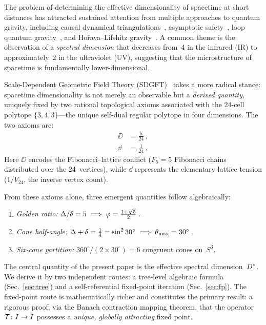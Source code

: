 \documentclass[amsmath,amssymb,aps,prd,twocolumn,superscriptaddress,nofootinbib]{revtex4-2}
\begin{document}
The problem of determining the effective dimensionality of spacetime
at short distances has attracted sustained attention from multiple
approaches to quantum gravity, including causal dynamical
triangulations~\cite{Ambjorn2005}, asymptotic
safety~\cite{Lauscher2005,Reuter2012}, loop quantum
gravity~\cite{Modesto2009}, and Ho\v{r}ava--Lifshitz
gravity~\cite{Horava2009}.  A common theme is the observation of a
\emph{spectral dimension} that decreases from~4 in the infrared (IR)
to approximately~2 in the ultraviolet (UV), suggesting that the
microstructure of spacetime is fundamentally lower-dimensional.

Scale-Dependent Geometric Field Theory
(SDGFT)~\cite{Goldstein_Paper01,Goldstein_Paper02,Goldstein_Paper03}
takes a more radical stance: spacetime dimensionality is not merely
an observable but a \emph{derived quantity}, uniquely fixed by two
rational topological axioms associated with the 24-cell polytope
$\{3,4,3\}$---the unique self-dual regular polytope in four
dimensions.  The two axioms are:
\begin{align}
  \DD &= \frac{5}{24}\,, \label{eq:axiom_Delta} \\
  \dd &= \frac{1}{24}\,. \label{eq:axiom_delta}
\end{align}
Here $\DD$ encodes the Fibonacci--lattice conflict
($F_5 = 5$ Fibonacci chains distributed over the 24~vertices),
while $\dd$ represents the elementary lattice tension
($1/V_{24}$, the inverse vertex count).

From these axioms alone, three emergent quantities follow
algebraically:
\begin{enumerate}
  \item \emph{Golden ratio:}\quad
    $\Delta/\delta = 5 \;\Longrightarrow\;
     \varphi = \tfrac{1+\sqrt{5}}{2}$\,.
  \item \emph{Cone half-angle:}\quad
    $\Delta + \delta = \tfrac{1}{4} = \sin^2 30^\circ
     \;\Longrightarrow\; \theta_{\mathrm{max}} = 30^\circ$\,.
  \item \emph{Six-cone partition:}\quad
    $360^\circ / (2 \times 30^\circ) = 6$ congruent cones
    on~$S^3$.
\end{enumerate}

The central quantity of the present paper is the effective spectral
dimension~$D^{*}$.  We derive it by two independent routes: a
tree-level algebraic formula (Sec.~\ref{sec:tree}) and a
self-referential fixed-point iteration (Sec.~\ref{sec:fp}).  The
fixed-point route is mathematically richer and constitutes the
primary result: a rigorous proof, via the Banach contraction mapping
theorem, that the operator
$\mathcal{T}\colon I \to I$ possesses a \emph{unique, globally
attracting} fixed point.
\end{document}
